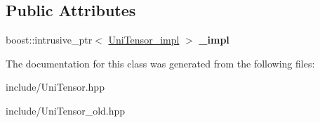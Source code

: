 \subsection*{Public Attributes}
\begin{DoxyCompactItemize}
\item 
\mbox{\label{classcytnx_1_1UniTensor_a39de13f941475075a365e98902104f35}} 
boost\+::intrusive\+\_\+ptr$<$ \hyperlink{classcytnx_1_1UniTensor__impl}{Uni\+Tensor\+\_\+impl} $>$ {\bfseries \+\_\+impl}
\end{DoxyCompactItemize}


The documentation for this class was generated from the following files\+:\begin{DoxyCompactItemize}
\item 
include/Uni\+Tensor.\+hpp\item 
include/Uni\+Tensor\+\_\+old.\+hpp\end{DoxyCompactItemize}
